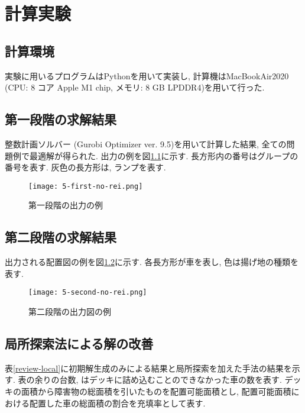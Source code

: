 \chapter{計算実験}\label{computational_result}
\section{計算環境}
実験に用いるプログラムはPythonを用いて実装し, 計算機はMacBookAir2020 (CPU: 8 コア Apple M1 chip, メモリ: 8 GB LPDDR4)を用いて行った. 

\section{第一段階の求解結果}
整数計画ソルバー (Gurobi Optimizer ver. 9.5)を用いて計算した結果, 全ての問題例で最適解が得られた. 
出力の例を図\ref{first-no-rei}に示す. 
長方形内の番号はグループの番号を表す. 
灰色の長方形は, ランプを表す. \\

\begin{figure}[b]
    \texttt{[image: 5-first-no-rei.png]}
    \caption{第一段階の出力の例}
    \label{first-no-rei}
\end{figure}
\clearpage

\section{第二段階の求解結果}
出力される配置図の例を図\ref{second-no-rei}に示す. 
各長方形が車を表し, 色は揚げ地の種類を表す. \\

\begin{figure}[b]
    \texttt{[image: 5-second-no-rei.png]}
    \caption{第二段階の出力図の例}
    \label{second-no-rei}
\end{figure}

\section{局所探索法による解の改善}
表\ref{review-local}に初期解生成のみによる結果と局所探索を加えた手法の結果を示す. 
表の余りの台数, はデッキに詰め込むことのできなかった車の数を表す. 
デッキの面積から障害物の総面積を引いたものを配置可能面積とし, 配置可能面積における配置した車の総面積の割合を充填率として表す. 


